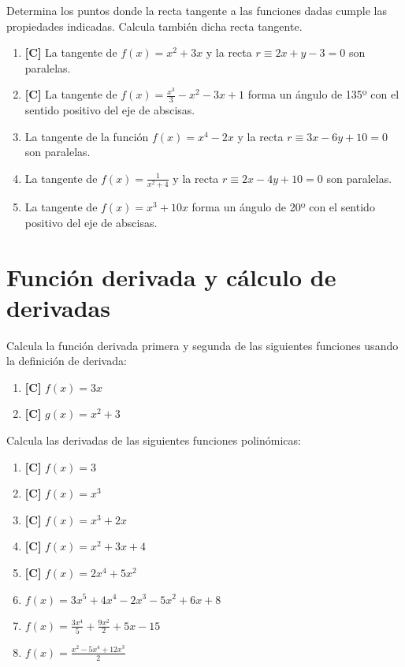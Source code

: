 \Exercicio Determina los puntos donde la recta tangente a las funciones dadas cumple las propiedades indicadas. Calcula también dicha recta tangente.
\begin{enumerate}[topsep=0pt]
	\item \textbf{[C]} La tangente de $f(x) = x^2+3x$ y la recta $r \equiv 2x+y -3 = 0$ son paralelas.
	\item \textbf{[C]} La tangente de $f(x) = \frac{x^3}{3} - x^2 -3x +1$ forma un ángulo de 135º con el sentido positivo del eje de abscisas.
	\item La tangente de la función $f(x) = x^4 - 2x$ y la recta $r \equiv 3x - 6y +10 = 0$ son paralelas.
	\item La tangente de $f(x) = \frac{1}{x^2 + 4}$ y la recta $r \equiv 2x - 4y +10 = 0$ son paralelas.
	\item La tangente de $f(x) = x^3 + 10x$ forma un ángulo de 20º con el sentido positivo del eje de abscisas.
\end{enumerate}


\section{Función derivada y cálculo de derivadas}

\Exercicio Calcula la función derivada primera y segunda de las siguientes funciones usando la definición de derivada:
\begin{enumerate}[topsep=0pt]
	\item \textbf{[C]} $f(x) = 3x$
	\item \textbf{[C]} $g(x) = x^2 + 3$
\end{enumerate}


\Exercicio Calcula las derivadas de las siguientes funciones polinómicas:

\begin{enumerate}[topsep=0pt]
	\item \textbf{[C]} $ f(x) = 3$
	\item \textbf{[C]} $ f(x) = x^3 $
	\item \textbf{[C]} $ f(x) = x^3 + 2x $
	\item \textbf{[C]} $ f(x) = x^2 + 3x + 4 $
	\item \textbf{[C]} $ f(x) = 2x^4 + 5x^2 $
	\item $ f(x) =  3x^5 +4x^4 -2x^3 -5x^2 +6x +8$
	\item $ f(x) =  \frac{3x^4}{5} + \frac{9x^2}{2} + 5x -15$
	\item $ f(x) =  \frac{x^2-5x^4+12x^3}{2}$
\end{enumerate}


